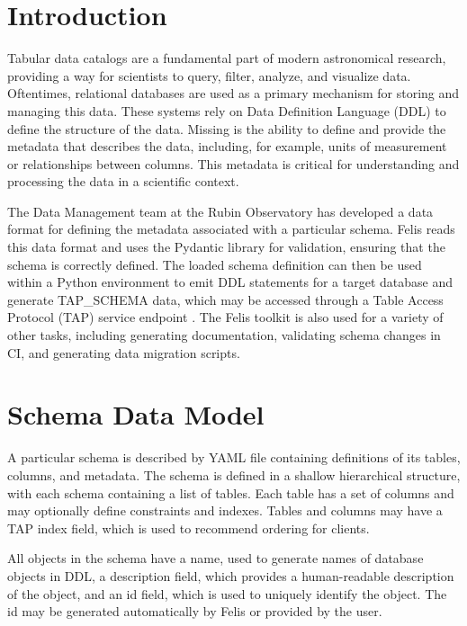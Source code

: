 \documentclass[11pt,twoside]{article}
\begin{document}
\section{Introduction}

Tabular data catalogs are a fundamental part of modern astronomical research, providing a way for scientists to query, filter, analyze, and visualize data.
Oftentimes, relational databases are used as a primary mechanism for storing and managing this data.
These systems rely on Data Definition Language (DDL) to define the structure of the data.
Missing is the ability to define and provide the metadata that describes the data, including, for example, units of measurement or relationships between columns.
This metadata is critical for understanding and processing the data in a scientific context.

The Data Management team at the Rubin Observatory has developed a data format for defining the metadata associated with a particular schema.
Felis reads this data format and uses the Pydantic library for validation, ensuring that the schema is correctly defined.
The loaded schema definition can then be used within a Python environment to emit DDL statements for a target database and generate TAP\_SCHEMA data, which may be accessed through a Table Access Protocol (TAP) service endpoint \citep{2019ivoa.spec.0927D}.
The Felis toolkit is also used for a variety of other tasks, including generating documentation, validating schema changes in CI, and generating data migration scripts.

\section{Schema Data Model}


A particular schema is described by YAML file containing definitions of its tables, columns, and metadata.
The schema is defined in a shallow hierarchical structure, with each schema containing a list of tables.
Each table has a set of columns and may optionally define constraints and indexes.
Tables and columns may have a TAP index field, which is used to recommend ordering for clients.

All objects in the schema have a name, used to generate names of database objects in DDL, a description field, which provides a human-readable description of the object, and an id field, which is used to uniquely identify the object.
The id may be generated automatically by Felis or provided by the user.
\end{document}
